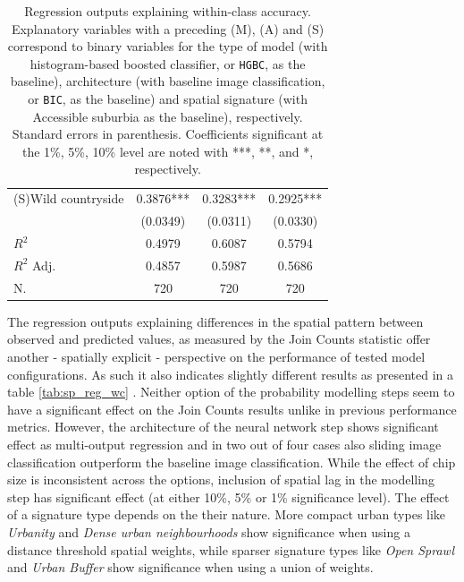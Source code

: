 \begin{table}
\begin{tabular}{lccc}
(S)Wild countryside                               &   0.3876*** &   0.3283*** &   0.2925*** \\
                                                  &    (0.0349) &    (0.0311) &    (0.0330) \\
\midrule
$R^2$                                             &      0.4979 &      0.6087 &      0.5794 \\
$R^2$ Adj.                                        &      0.4857 &      0.5987 &      0.5686 \\
N.                                                &      720    &      720    &      720    \\
\bottomrule
\end{tabular}
    \caption{\label{tab:non_sp_reg_wc}\footnotesize Regression outputs explaining
            within-class accuracy. Explanatory variables with a preceding (M),
            (A) and (S)
    correspond to binary variables for the type of model (with histogram-based
            boosted classifier, or \texttt{HGBC}, as the
    baseline), architecture (with baseline image classification, or
    \texttt{BIC}, as the baseline) and spatial signature (with Accessible
    suburbia as the baseline),
    respectively. Standard errors in parenthesis. Coefficients significant at
    the 1\%, 5\%, 10\% level are noted with ***, **, and *, respectively.}
\end{table}



The regression outputs explaining differences in the spatial pattern between observed
and predicted values, as measured by the Join Counts statistic offer another - spatially
explicit - perspective on the performance of tested model configurations. As such it
also indicates slightly different results as presented in a table \ref{tab:sp_reg_wc} .
Neither option of the probability modelling steps seem to have a significant effect on
the Join Counts results unlike in previous performance metrics. However, the
architecture of the neural network step shows significant effect as multi-output
regression and in two out of four cases also sliding image classification outperform the
baseline image classification. While the effect of chip size is inconsistent across the
options, inclusion of spatial lag in the modelling step has significant effect (at
either 10\%, 5\% or 1\% significance level). The effect of a signature type depends on
the their nature. More compact urban types like \textit{Urbanity} and \textit{Dense
urban neighbourhoods} show significance when using a distance threshold spatial weights,
while sparser signature types like \textit{Open Sprawl} and \textit{Urban Buffer} show
significance when using a union of weights.


